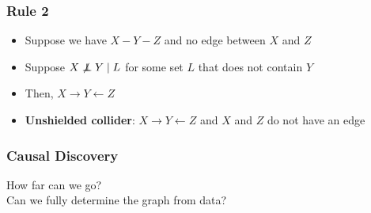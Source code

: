 \documentclass{beamer}
\def\independenT#1#2{\mathrel{\rlap{$#1#2$}\mkern2mu{#1#2}}}
\newcommand\indep{\protect\mathpalette{\protect\independenT}{\perp}}
\begin{document}
\begin{frame}
\frametitle{Rule 2}

\begin{itemize}
    \item Suppose we have $X - Y - Z$ and no edge between $X$ and $Z$
    \item Suppose $X \not \indep Y \mid L$ for some set $L$ that does not contain $Y$ \pause 
    \item Then, $X \rightarrow Y \leftarrow Z$ \pause
    \item \textbf{Unshielded collider}: $X \rightarrow Y \leftarrow Z$ and $X$ and $Z$ do not have an edge
\end{itemize}
\end{frame}



\begin{frame}
\frametitle{Causal Discovery}

\large
How far can we go? \\
Can we fully determine the graph from data?

\end{frame}
\end{document}

